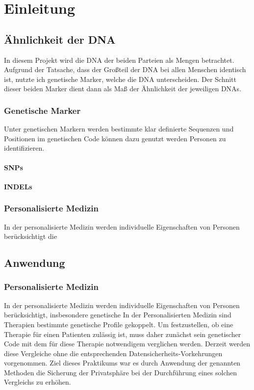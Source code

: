 \chapter{Einleitung}
\label{sec:Chapter1}


\section{Ähnlichkeit der DNA}
In diesem Projekt wird die DNA der beiden Parteien als Mengen betrachtet.
Aufgrund der Tatsache, dass der Großteil der DNA bei allen Menschen identisch ist, nutzte ich genetische Marker, welche die DNA unterscheiden.
Der Schnitt dieser beiden Marker dient  dann als Maß der Ähnlichkeit  der jeweiligen DNAs.
\subsection{Genetische Marker}

Unter genetischen Markern werden bestimmte klar definierte Sequenzen und Positionen im genetischen Code können dazu genutzt werden Personen zu identifizieren.

\subsubsection{SNPs}


\subsubsection{INDELs}

\subsection{Personalisierte Medizin}
In der personalisierte Medizin werden individuelle Eigenschaften von Personen berücksichtigt die  



\section{Anwendung}

\subsection{Personalisierte Medizin}
In der personalisierte Medizin werden individuelle Eigenschaften von Personen berücksichtigt, insbesondere genetische 
In der Personalisierten Medizin sind  Therapien bestimmte genetische Profile  gekoppelt.
Um festzustellen, ob eine Therapie für einen Patienten zulässig ist, muss daher zunächst sein genetischer Code mit dem für diese Therapie notwendigem verglichen werden.
Derzeit werden diese Vergleiche ohne die entsprechenden Datensicherheits-Vorkehrungen vorgenommen.
Ziel dieses Praktikums war es durch Anwendung der genannten Methoden die Sicherung der Privatsphäre bei der Durchführung eines solchen Vergleichs zu erhöhen.

